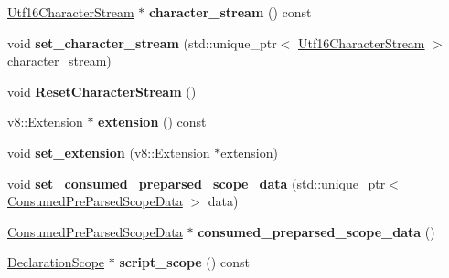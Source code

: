 \begin{DoxyCompactItemize}
\item 
\mbox{\label{classv8_1_1internal_1_1ParseInfo_a60c8840c9dc31576eff7983adf4669e6}} 
\mbox{\hyperlink{classv8_1_1internal_1_1Utf16CharacterStream}{Utf16\+Character\+Stream}} $\ast$ {\bfseries character\+\_\+stream} () const
\item 
\mbox{\label{classv8_1_1internal_1_1ParseInfo_abdedf3441250c45fe58ff42558a4a8ee}} 
void {\bfseries set\+\_\+character\+\_\+stream} (std\+::unique\+\_\+ptr$<$ \mbox{\hyperlink{classv8_1_1internal_1_1Utf16CharacterStream}{Utf16\+Character\+Stream}} $>$ character\+\_\+stream)
\item 
\mbox{\label{classv8_1_1internal_1_1ParseInfo_a4f3b9eb77f9c7505961ab4f19c62450f}} 
void {\bfseries Reset\+Character\+Stream} ()
\item 
\mbox{\label{classv8_1_1internal_1_1ParseInfo_ad6cdb047172108d6b1860f246a439072}} 
v8\+::\+Extension $\ast$ {\bfseries extension} () const
\item 
\mbox{\label{classv8_1_1internal_1_1ParseInfo_a34ac588ed941a292bbff1ac5778fd4e2}} 
void {\bfseries set\+\_\+extension} (v8\+::\+Extension $\ast$extension)
\item 
\mbox{\label{classv8_1_1internal_1_1ParseInfo_a7189c966110edd125b8a8be1e5b2918e}} 
void {\bfseries set\+\_\+consumed\+\_\+preparsed\+\_\+scope\+\_\+data} (std\+::unique\+\_\+ptr$<$ \mbox{\hyperlink{classv8_1_1internal_1_1ConsumedPreParsedScopeData}{Consumed\+Pre\+Parsed\+Scope\+Data}} $>$ data)
\item 
\mbox{\label{classv8_1_1internal_1_1ParseInfo_acb5a44e17ac740613f02cf450db733be}} 
\mbox{\hyperlink{classv8_1_1internal_1_1ConsumedPreParsedScopeData}{Consumed\+Pre\+Parsed\+Scope\+Data}} $\ast$ {\bfseries consumed\+\_\+preparsed\+\_\+scope\+\_\+data} ()
\item 
\mbox{\label{classv8_1_1internal_1_1ParseInfo_aa47f35083b6eb81ff91de7cc631bcd9f}} 
\mbox{\hyperlink{classv8_1_1internal_1_1DeclarationScope}{Declaration\+Scope}} $\ast$ {\bfseries script\+\_\+scope} () const

\end{DoxyCompactItemize}
